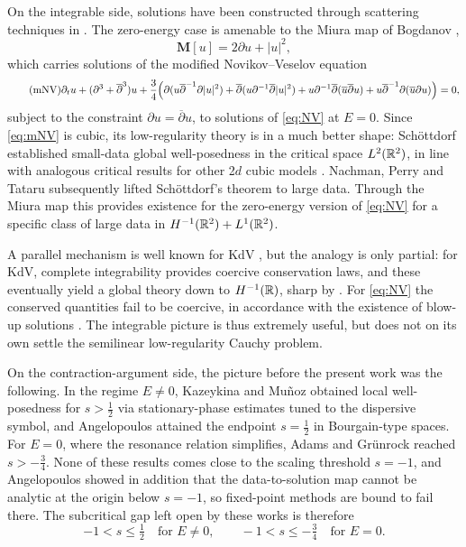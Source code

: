 \medskip

On the integrable side, solutions have been constructed through scattering techniques in \cite{BLMP, Tsai, Perry, MusicPerry}. The zero-energy case is amenable to the Miura map of Bogdanov \cite{Bogdanov},
\begin{equation}
\mathbf{M}[u]= 2\partial u + |u|^2,
\end{equation}
which carries solutions of the modified Novikov--Veselov equation
\begin{equation}\label{eq:mNV}\tag{mNV}
\partial_t u + (\partial^3+\overline{\partial}^3) u + \frac34\Bigl(\partial(u\overline{\partial}^{-1}\partial |u|^2) + \overline{\partial}(u\partial^{-1}\overline{\partial}|u|^2) + u\partial^{-1}\overline{\partial}(\overline{u}\overline{\partial}u) + u\overline{\partial}^{-1}\partial(\overline{u}\partial u)\Bigr)=0,
\end{equation}
subject to the constraint $\partial u=\overline{\partial} u$, to solutions of \eqref{eq:NV} at $E=0$. Since \eqref{eq:mNV} is cubic, its low-regularity theory is in a much better shape: Sch\"ottdorf \cite{Schottdorf} established small-data global well-posedness in the critical space $L^2(\mathbb{R}^2)$, in line with analogous critical results for other 2$d$ cubic models \cite{MPS_Dysthe, CorreiaKinoshita}. Nachman, Perry and Tataru \cite{NPT_mNV} subsequently lifted Sch\"ottdorf's theorem to large data. Through the Miura map this provides existence for the zero-energy version of \eqref{eq:NV} for a specific class of large data in $H^{-1}(\mathbb{R}^2)+L^1(\mathbb{R}^2)$.

\medskip

A parallel mechanism is well known for KdV \cite{Miura, KPST_miura, CKSTT_sharp_kdv, KT06, BuckmasterKoch, KillipVisan_kdv}, but the analogy is only partial: for KdV, complete integrability provides coercive conservation laws, and these eventually yield a global theory down to $H^{-1}(\mathbb{R})$, sharp by \cite{Molinet_ill_line}. For \eqref{eq:NV} the conserved quantities fail to be coercive, in accordance with the existence of blow-up solutions \cite{TaimanovTsarev}. The integrable picture is thus extremely useful, but does not on its own settle the semilinear low-regularity Cauchy problem.

\medskip

On the contraction-argument side, the picture before the present work was the following. In the regime $E\neq 0$, Kazeykina and Mu\~noz \cite{kazeykinamunoz1, kazeykinamunoz2} obtained local well-posedness for $s>\tfrac12$ via stationary-phase estimates tuned to the dispersive symbol, and Angelopoulos \cite{angelopolous} attained the endpoint $s=\tfrac12$ in Bourgain-type spaces. For $E=0$, where the resonance relation simplifies, Adams and Gr\"unrock \cite{adamsgrunrock} reached $s>-\tfrac34$. None of these results comes close to the scaling threshold $s=-1$, and Angelopoulos showed in addition that the data-to-solution map cannot be analytic at the origin below $s=-1$, so fixed-point methods are bound to fail there. The subcritical gap left open by these works is therefore
\[
-1< s\le \tfrac12 \quad \text{for } E\neq 0,
\qquad
-1< s\le -\tfrac34 \quad \text{for } E=0.
\]

